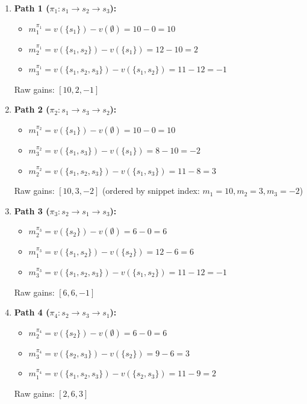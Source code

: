 \documentclass{article}
\begin{document}
\begin{enumerate}
    \item \textbf{Path 1 ($\pi_1: s_1 \to s_2 \to s_3$):} 
    \begin{itemize}
        \item $m_1^{\pi_1} = v(\{s_1\}) - v(\emptyset) = 10 - 0 = 10$
        \item $m_2^{\pi_1} = v(\{s_1, s_2\}) - v(\{s_1\}) = 12 - 10 = 2$
        \item $m_3^{\pi_1} = v(\{s_1, s_2, s_3\}) - v(\{s_1, s_2\}) = 11 - 12 = -1$
    \end{itemize}
    Raw gains: $[10, 2, -1]$

    \item \textbf{Path 2 ($\pi_2: s_1 \to s_3 \to s_2$):} 
    \begin{itemize}
        \item $m_1^{\pi_2} = v(\{s_1\}) - v(\emptyset) = 10 - 0 = 10$
        \item $m_3^{\pi_2} = v(\{s_1, s_3\}) - v(\{s_1\}) = 8 - 10 = -2$
        \item $m_2^{\pi_2} = v(\{s_1, s_2, s_3\}) - v(\{s_1, s_3\}) = 11 - 8 = 3$
    \end{itemize}
    Raw gains: $[10, 3, -2]$ (ordered by snippet index: $m_1=10, m_2=3, m_3=-2$)

    \item \textbf{Path 3 ($\pi_3: s_2 \to s_1 \to s_3$):} 
    \begin{itemize}
        \item $m_2^{\pi_3} = v(\{s_2\}) - v(\emptyset) = 6 - 0 = 6$
        \item $m_1^{\pi_3} = v(\{s_1, s_2\}) - v(\{s_2\}) = 12 - 6 = 6$
        \item $m_3^{\pi_3} = v(\{s_1, s_2, s_3\}) - v(\{s_1, s_2\}) = 11 - 12 = -1$
    \end{itemize}
    Raw gains: $[6, 6, -1]$

    \item \textbf{Path 4 ($\pi_4: s_2 \to s_3 \to s_1$):} 
    \begin{itemize}
        \item $m_2^{\pi_4} = v(\{s_2\}) - v(\emptyset) = 6 - 0 = 6$
        \item $m_3^{\pi_4} = v(\{s_2, s_3\}) - v(\{s_2\}) = 9 - 6 = 3$
        \item $m_1^{\pi_4} = v(\{s_1, s_2, s_3\}) - v(\{s_2, s_3\}) = 11 - 9 = 2$
    \end{itemize}
    Raw gains: $[2, 6, 3]$


\end{enumerate}
\end{document}
